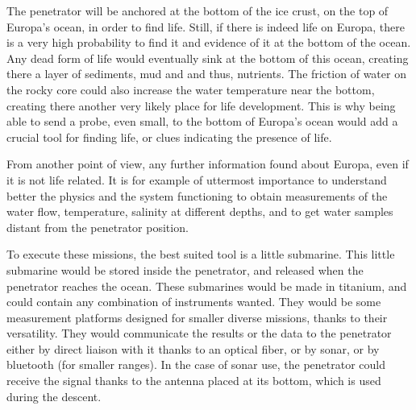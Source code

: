 
The penetrator will be anchored at the bottom of the ice crust, on the top of Europa's ocean, in order to find life. Still, if there is indeed life on Europa, there is a very high probability to find it and evidence of it at the bottom of the ocean. Any dead form of life would eventually sink at the bottom of this ocean, creating there a layer of sediments, mud and and thus, nutrients. The friction of water on the rocky core could also increase the water temperature near the bottom, creating there another very likely place for life development. This is why being able to send a probe, even small, to the bottom of Europa's ocean would add a crucial tool for finding life, or clues indicating the presence of life.


From another point of view, any further information found about Europa, even if it is not life related. It is for example of uttermost importance to understand better the physics and the system functioning to obtain measurements of the water flow, temperature, salinity at different depths, and to get water samples distant from the penetrator position.


To execute these missions, the best suited tool is a little submarine. This little submarine would be stored inside the penetrator, and released when the penetrator  reaches the ocean. These submarines would be made in titanium, and could contain any combination of instruments wanted. They would be some measurement platforms designed for smaller diverse missions, thanks to their versatility. They would communicate the results or the data to the penetrator either by direct liaison with it thanks to an optical fiber, or by sonar, or by bluetooth (for smaller ranges). In the case of sonar use, the penetrator could receive the signal thanks to the antenna placed at its bottom, which is used during the descent.


